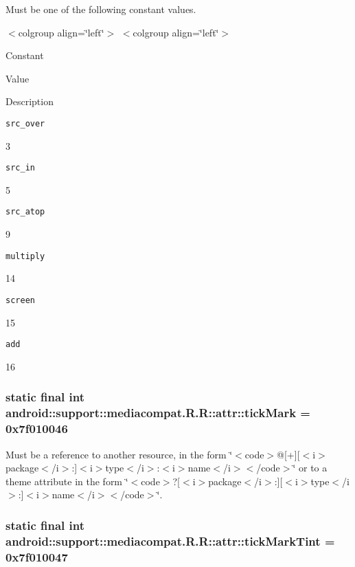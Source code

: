 Must be one of the following constant values. \begin{TabularC}{0}
\hline
\end{TabularC}
$<$colgroup align=\char`\"{}left\char`\"{}$>$ $<$colgroup align=\char`\"{}left\char`\"{}$>$ 

Constant

Value

Description 

{\tt src\_\-over}

3

{\tt src\_\-in}

5

{\tt src\_\-atop}

9

{\tt multiply}

14

{\tt screen}

15

{\tt add}

16\hypertarget{classandroid_1_1support_1_1mediacompat_1_1_r_1_1attr_f058b56d55597d8466d588116baf8fe9}{
\subsubsection[{tickMark}]{\setlength{\rightskip}{0pt plus 5cm}static final int android::support::mediacompat.R.R::attr::tickMark = 0x7f010046}}
\label{classandroid_1_1support_1_1mediacompat_1_1_r_1_1attr_f058b56d55597d8466d588116baf8fe9}


Must be a reference to another resource, in the form \char`\"{}$<$code$>$@\mbox{[}+\mbox{]}\mbox{[}$<$i$>$package$<$/i$>$:\mbox{]}$<$i$>$type$<$/i$>$:$<$i$>$name$<$/i$>$$<$/code$>$\char`\"{} or to a theme attribute in the form \char`\"{}$<$code$>$?\mbox{[}$<$i$>$package$<$/i$>$:\mbox{]}\mbox{[}$<$i$>$type$<$/i$>$:\mbox{]}$<$i$>$name$<$/i$>$$<$/code$>$\char`\"{}. \hypertarget{classandroid_1_1support_1_1mediacompat_1_1_r_1_1attr_f2959f2c05246d3b6808fc56d5427151}{
\subsubsection[{tickMarkTint}]{\setlength{\rightskip}{0pt plus 5cm}static final int android::support::mediacompat.R.R::attr::tickMarkTint = 0x7f010047}}
\label{classandroid_1_1support_1_1mediacompat_1_1_r_1_1attr_f2959f2c05246d3b6808fc56d5427151}


